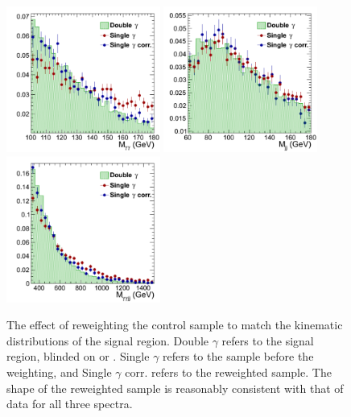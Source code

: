 \begin{figure}[ht]
 \begin{center}
   \includegraphics[width=0.45\textwidth]{figures/selection/mggSpectrum.pdf}
   \includegraphics[width=0.45\textwidth]{figures/selection/mjjSpectrum.pdf}
   \includegraphics[width=0.45\textwidth]{figures/selection/mggjjSpectrum.pdf}
 \end{center}
\caption{The effect of reweighting the \gjjj control sample to match the kinematic distributions of the
signal region. Double $\gamma$ refers to the signal region, blinded on \Mgg or \Mjj. Single $\gamma$
refers to the \gjjj sample before the weighting, and Single $\gamma$ corr. refers to the reweighted
\gjjj sample. The shape of the reweighted \gjjj sample is reasonably consistent with that of data
for all three spectra.}
\label{fig:datacs}
\end{figure}

